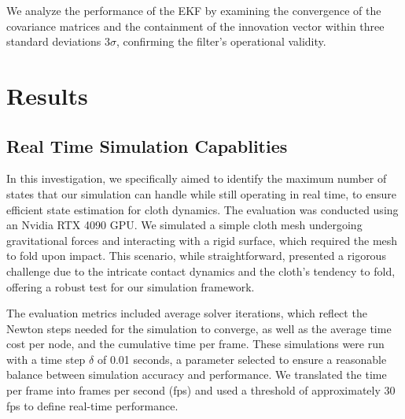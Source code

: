 \documentclass[subscriptcorrection,upint,varvw,barcolor=Goldenrod3,mathalfa=cal=euler,balance,hyphenate,french,pdf-a, nofoot]{asmejour} %
\begin{document}
We analyze the performance of the EKF by examining the convergence of the covariance matrices and the containment of the innovation vector within three standard deviations \(3\sigma\), confirming the filter's operational validity.


\section{Results}
\subsection{Real Time Simulation Capablities}
In this investigation, we specifically aimed to identify the maximum number of states that our simulation can handle while still operating in real time, to ensure efficient state estimation for cloth dynamics. The evaluation was conducted using an Nvidia RTX 4090 GPU. We simulated a simple cloth mesh undergoing gravitational forces and interacting with a rigid surface, which required the mesh to fold upon impact. This scenario, while straightforward, presented a rigorous challenge due to the intricate contact dynamics and the cloth's tendency to fold, offering a robust test for our simulation framework.

The evaluation metrics included average solver iterations, which reflect the Newton steps needed for the simulation to converge, as well as the average time cost per node, and the cumulative time per frame. These simulations were run with a time step \(\delta\) of 0.01 seconds, a parameter selected to ensure a reasonable balance between simulation accuracy and performance. We translated the time per frame into frames per second (fps) and used a threshold of approximately 30 fps to define real-time performance.
\end{document}
